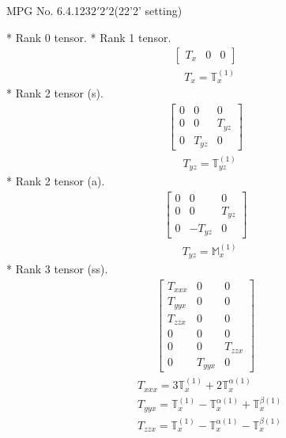 \documentclass[fleqn,8pt,landscape]{jsarticle}
\begin{document}
\setcounter{MaxMatrixCols}{32}

\renewcommand{\tablename}{Table~}
\renewcommand{\figurename}{Figure~}
\begin{center}
\LARGE
MPG No. 6.4.123\quad$2'2'2$\quad(22'2' setting)
\end{center}
* Rank 0 tensor.
* Rank 1 tensor.
\begin{align*}
\begin{bmatrix} T_{x} & 0 & 0 \end{bmatrix}
\end{align*}
\begin{align*}
& T_{x} = \mathbb{T}_{x}^{(1)}
\end{align*}
* Rank 2 tensor (s).
\begin{align*}
\begin{bmatrix} 0 & 0 & 0 \\ 0 & 0 & T_{yz} \\ 0 & T_{yz} & 0 \end{bmatrix}
\end{align*}
\begin{align*}
& T_{yz} = \mathbb{T}_{yz}^{(1)}
\end{align*}
* Rank 2 tensor (a).
\begin{align*}
\begin{bmatrix} 0 & 0 & 0 \\ 0 & 0 & T_{yz} \\ 0 & - T_{yz} & 0 \end{bmatrix}
\end{align*}
\begin{align*}
& T_{yz} = \mathbb{M}_{x}^{(1)}
\end{align*}
* Rank 3 tensor (ss).
\begin{align*}
\begin{bmatrix} T_{xxx} & 0 & 0 \\ T_{yyx} & 0 & 0 \\ T_{zzx} & 0 & 0 \\ 0 & 0 & 0 \\ 0 & 0 & T_{zzx} \\ 0 & T_{yyx} & 0 \end{bmatrix}
\end{align*}
\begin{align*}
& T_{xxx} = 3 \mathbb{T}_{x}^{(1)} + 2 \mathbb{T}_{x}^{\alpha(1)} \\
& T_{yyx} = \mathbb{T}_{x}^{(1)} - \mathbb{T}_{x}^{\alpha(1)} + \mathbb{T}_{x}^{\beta(1)} \\
& T_{zzx} = \mathbb{T}_{x}^{(1)} - \mathbb{T}_{x}^{\alpha(1)} - \mathbb{T}_{x}^{\beta(1)}
\end{align*}
\end{document}
